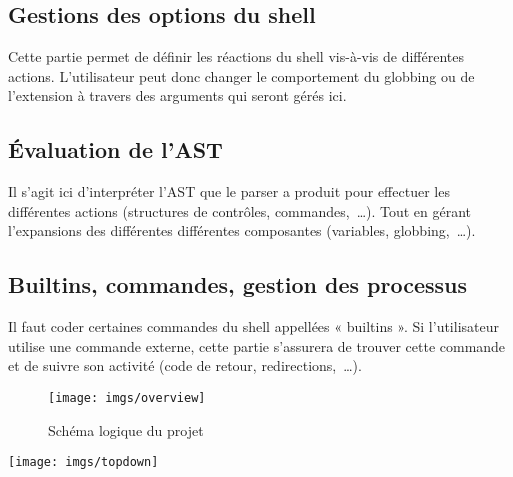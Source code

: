 \subsection{Gestions des options du shell}

Cette partie permet de définir les réactions du shell vis-à-vis de différentes
actions. L'utilisateur peut donc changer le comportement du globbing ou de
l'extension à travers des arguments qui seront gérés ici.

\subsection{Évaluation de l'AST}

Il s'agit ici d'interpréter l'AST que le parser a produit pour effectuer les
différentes actions (structures de contrôles, commandes,~\dots). Tout en gérant
l'expansions des différentes différentes composantes (variables,
globbing,~\dots).

\subsection{Builtins, commandes, gestion des processus}

Il faut coder certaines commandes du shell appellées « builtins ». Si
l'utilisateur utilise une commande externe, cette partie s'assurera de trouver
cette commande et de suivre son activité (code de retour, redirections,~\dots).

\begin{sidewaysfigure}[H]
    \texttt{[image: imgs/overview]}
    \caption{Schéma logique du projet}
\end{sidewaysfigure}

\begin{center}
    \texttt{[image: imgs/topdown]}
\end{center}
